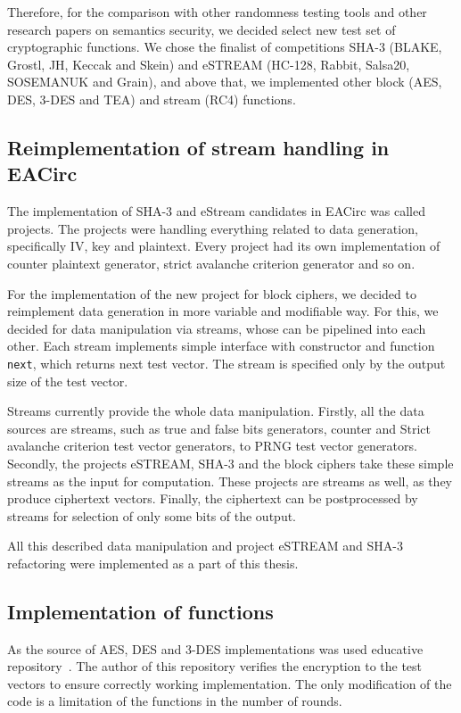 \documentclass[
  print, %
  Table,   %
  nolof,     %
  nolot,     %
  11pt, %
  oneside  %
]{fithesis3}
\begin{document}
Therefore, for the comparison with other randomness testing tools and other research papers on semantics security, we decided select new test set of cryptographic functions. We chose the finalist of competitions SHA-3 (BLAKE, Grostl, JH, Keccak and Skein) and eSTREAM (HC-128, Rabbit, Salsa20, SOSEMANUK and Grain), and above that, we implemented other block (AES, DES, 3-DES and TEA) and stream (RC4) functions.

\subsection{Reimplementation of stream handling in EACirc}
\label{subsec:method-data-streams}

The implementation of SHA-3 and eStream candidates in EACirc was called projects. The projects were handling everything related to data generation, specifically IV, key and plaintext. Every project had its own implementation of counter plaintext generator, strict avalanche criterion generator and so on.

For the implementation of the new project for block ciphers, we decided to reimplement data generation in more variable and modifiable way. For this, we decided for data manipulation via streams, whose can be pipelined into each other. Each stream implements simple interface with constructor and function \texttt{next}, which returns next test vector. The stream is specified only by the output size of the test vector.

Streams currently provide the whole data manipulation. Firstly, all the data sources are streams, such as true and false bits generators, counter and Strict avalanche criterion test vector generators, to PRNG test vector generators. Secondly, the projects eSTREAM, SHA-3 and the block ciphers take these simple streams as the input for computation. These projects are streams as well, as they produce ciphertext vectors. Finally, the ciphertext can be postprocessed by streams for selection of only some bits of the output.

All this described data manipulation and project eSTREAM and SHA-3 refactoring were implemented as a part of this thesis.

\subsection{Implementation of functions}
\label{subsec:method-data-funcs}

As the source of AES, DES and 3-DES implementations was used educative repository~\cite{cryptoFunc}. The author of this repository verifies the encryption to the test vectors to ensure correctly working implementation. The only modification of the code is a limitation of the functions in the number of rounds.
\end{document}
